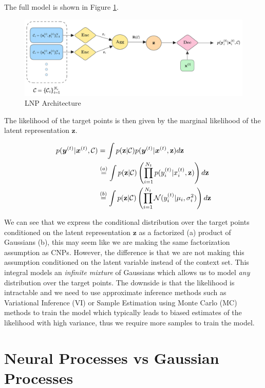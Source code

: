 \documentclass[../../main.tex]{subfiles}
\begin{document}
The full model is shown in Figure \ref{fig:lnp-architecture}.

\begin{figure}[H]
	\centering
	\includegraphics[height=0.3\textwidth]{./lnp.png}
	\caption{LNP Architecture}
	\label{fig:lnp-architecture}
\end{figure}

The likelihood of the target points is then given by the marginal likelihood of the latent representation $\mathbf{z}$.

\begin{align}
    p(\bm{y}^{(t)} | \bm{x}^{(t)}, \mathcal{C}) &=  \int p(\mathbf{z} | \mathcal{C}) p(\bm{y}^{(t)} | \bm{x}^{(t)}, \mathbf{z})  d\mathbf{z}
    \\ &\stackrel{(a)}{=} \int p(\mathbf{z} | \mathcal{C}) \left(\prod_{i=1}^{N_t} p({y}_i^{(t)} | {x}_i^{(t)}, \mathbf{z})\right)  d\mathbf{z}
    \\ &\stackrel{(b)}{=} \int p(\mathbf{z} | \mathcal{C}) \left(\prod_{i=1}^{N_t} \mathcal{N}({y}_i^{(t)} | \mu_i, \sigma_i^2)\right)  d\mathbf{z}
\end{align}

We can see that we express the conditional distribution over the target points conditioned on the latent representation $\mathbf{z}$ as a factorized (a) product of Gaussians (b), this may seem like we are making the same factorization assumption as CNPs. However, the difference is that we are not making this assumption conditioned on the latent variable instead of the context set. This integral models an \emph{infinite mixture} of Gaussians which allows us to model \emph{any} distribution over the target points.  The downside is that the likelihood is intractable and we need to use approximate inference methods such as Variational Inference (VI) or Sample Estimation using Monte Carlo (MC) methods to train the model which typically leads to biased estimates of the likelihood with high variance, thus we require more samples to train the model.


\section{Neural Processes vs Gaussian Processes}
\end{document}
